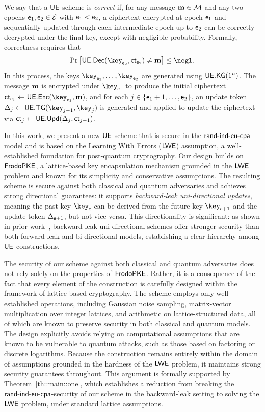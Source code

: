 \documentclass{fundam}
\begin{document}
We say that a $\mathsf{UE}$ scheme is \emph{correct} if, for any message $\mathbf{m} \in \mathcal{M}$ and any two epochs $\mathsf{e}_1, \mathsf{e}_2 \in \mathcal{E}$ with $\mathsf{e}_1 < \mathsf{e}_2$, a ciphertext encrypted at epoch $\mathsf{e}_1$ and sequentially updated through each intermediate epoch up to $\mathsf{e}_2$ can be correctly decrypted under the final key, except with negligible probability. Formally, correctness requires that
\[
\Pr\left[ \uedec(\key_{\epoch_2}, \ct_{\epoch_2}) \neq \m \right] \leq \negl.
\]
In this process, the keys $\key_{\epoch_1}, \ldots, \key_{\epoch_2}$ are generated using $\mathsf{UE.KG}(1^n)$. The message $\mathbf{m}$ is encrypted under $\key_{\epoch_1}$ to produce the initial ciphertext $\ct_{\epoch_1} \gets \ueenc(\key_{\epoch_1}, \m)$, and for each $j \in \{\mathsf{e}_1 + 1, \ldots, \mathsf{e}_2\}$, an update token $\tok_j \gets \uetg(\key_{j-1}, \key_j)$ is generated and applied to update the ciphertext via $\mathsf{ct}_j \gets \mathsf{UE.Upd}(\Delta_j, \mathsf{ct}_{j-1})$.


In this work, we present a new $\mathsf{UE}$ scheme that is secure in the $\mathsf{rand}{\text{-}}\mathsf{ind}{\text{-}}\mathsf{eu}{\text{-}}\mathsf{cpa}$ model and is based on the Learning With Errors ($\mathsf{LWE}$) assumption, a well-established foundation for post-quantum cryptography. Our design builds on $\mathsf{FrodoPKE}$, a lattice-based key encapsulation mechanism grounded in the $\mathsf{LWE}$ problem and known for its simplicity and conservative assumptions. The resulting scheme is secure against both classical and quantum adversaries and achieves strong directional guarantees: it supports \emph{backward-leak uni-directional updates}, meaning the past key $\key_{\epoch}$ can be derived from the future key $\key_{\epoch+1}$ and the update token $\Delta_{\mathsf{e}+1}$, but not vice versa. This directionality is significant: as shown in prior work~\cite{nishimaki2022direction}, backward-leak uni-directional schemes offer stronger security than both forward-leak and bi-directional models, establishing a clear hierarchy among $\mathsf{UE}$ constructions.


The security of our scheme against both classical and quantum adversaries does not rely solely on the properties of $\mathsf{FrodoPKE}$. Rather, it is a consequence of the fact that every element of the construction is carefully designed within the framework of lattice-based cryptography. The scheme employs only well-established operations, including Gaussian noise sampling, matrix-vector multiplication over integer lattices, and arithmetic on lattice-structured data, all of which are known to preserve security in both classical and quantum models. The design explicitly avoids relying on computational assumptions that are known to be vulnerable to quantum attacks, such as those based on factoring or discrete logarithms. Because the construction remains entirely within the domain of assumptions grounded in the hardness of the $\mathsf{LWE}$ problem, it maintains strong security guarantees throughout. This argument is formally supported by Theorem~\ref{th::main::one}, which establishes a reduction from breaking the $\mathsf{rand}{\text{-}}\mathsf{ind}{\text{-}}\mathsf{eu}{\text{-}}\mathsf{cpa}$-security of our scheme in the backward-leak setting to solving the $\mathsf{LWE}$ problem, under standard lattice assumptions.
\end{document}
